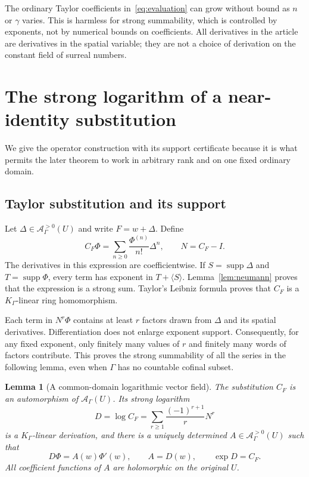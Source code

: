 \documentclass[11pt,a4paper]{article}
\numberwithin{equation}{section}
\newtheorem{lemma}[theorem]{Lemma}
\theoremstyle{definition}
\theoremstyle{remark}
\newcommand{\K}{K_\Gamma}
\newcommand{\A}{\mathscr A_\Gamma}
\newcommand{\supp}{\operatorname{supp}}
\newcommand{\Neu}[1]{\langle #1\rangle}
\begin{document}
The ordinary Taylor coefficients in~\eqref{eq:evaluation} can grow without
bound as $n$ or $\gamma$ varies.  This is harmless for strong summability,
which is controlled by exponents, not by numerical bounds on coefficients.
All derivatives in the article are derivatives in the spatial variable;
they are not a choice of derivation on the constant field of surreal
numbers.

\section{The strong logarithm of a near-identity substitution}
\label{sec:log}

We give the operator construction with its support certificate because it
is what permits the later theorem to work in arbitrary rank and on one
fixed ordinary domain.

\subsection{Taylor substitution and its support}

Let $\Delta\in\A^{>0}(U)$ and write $F=w+\Delta$.  Define
\begin{equation}\label{eq:substitution}
 C_F\Phi=\sum_{n\ge0}\frac{\Phi^{(n)}}{n!}\Delta^n,
 \qquad N=C_F-I.
\end{equation}
The derivatives in this expression are coefficientwise.  If
$S=\supp\Delta$ and $T=\supp\Phi$, every term has exponent in
$T+\Neu S$.  Lemma~\ref{lem:neumann} proves that the expression is a strong
sum.  Taylor's Leibniz formula proves that $C_F$ is a $\K$-linear ring
homomorphism.

Each term in $N^r\Phi$ contains at least $r$ factors drawn from $\Delta$
and its spatial derivatives.  Differentiation does not enlarge exponent
support.  Consequently, for any fixed exponent, only finitely many values
of $r$ and finitely many words of factors contribute.  This proves the
strong summability of all the series in the following lemma, even when
$\Gamma$ has no countable cofinal subset.

\begin{lemma}[A common-domain logarithmic vector field]
\label{lem:logvector}
The substitution $C_F$ is an automorphism of $\A(U)$.  Its strong logarithm
\begin{equation}\label{eq:operatorlog}
 D=\log C_F=\sum_{r\ge1}\frac{(-1)^{r+1}}r N^r
\end{equation}
is a $\K$-linear derivation, and there is a uniquely determined
$A\in\A^{>0}(U)$ such that
\begin{equation}\label{eq:vectorfield}
 D\Phi=A(w)\Phi'(w),\qquad A=D(w),\qquad \exp D=C_F.
\end{equation}
All coefficient functions of $A$ are holomorphic on the original $U$.
\end{lemma}
\end{document}
